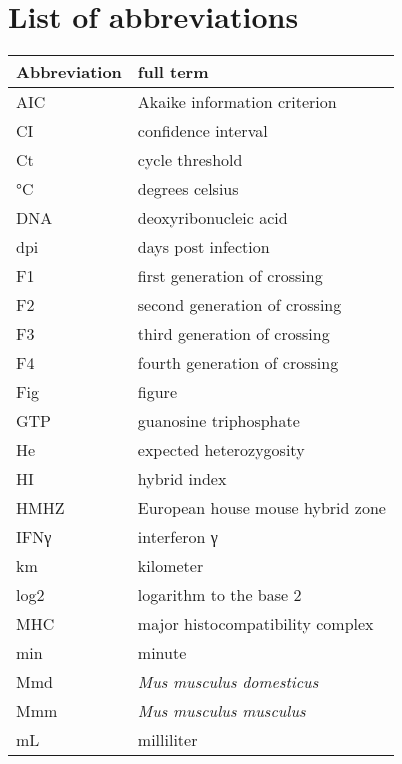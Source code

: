 \documentclass[11pt]{report}
\numberwithin{equation}{section} %
\begin{document}


\newpage
\thispagestyle{empty}
\mbox{}
\newpage


\clearpage

\clearpage


\tableofcontents

\chapter*{List of abbreviations}
\begin{tabular}{l l}
Abbreviation & full term \\
\hline
AIC & Akaike information criterion \\
CI & confidence interval \\
Ct & cycle threshold \\
°C & degrees celsius \\
DNA & deoxyribonucleic acid \\
dpi & days post infection \\
F1 & first generation of crossing \\
F2 & second generation of crossing \\
F3 & third generation of crossing \\
F4 & fourth generation of crossing \\
Fig & figure \\
GTP & guanosine triphosphate \\
He & expected heterozygosity \\
HI & hybrid index \\
HMHZ   & European house mouse hybrid zone \\
IFNγ & interferon γ \\
km & kilometer \\
log2 & logarithm to the base 2 \\
MHC & major histocompatibility complex \\
min & minute \\
Mmd & \textit{Mus musculus domesticus} \\
Mmm    & \textit{Mus musculus musculus}  \\
mL & milliliter
\end{tabular}

\newpage
\end{document}
